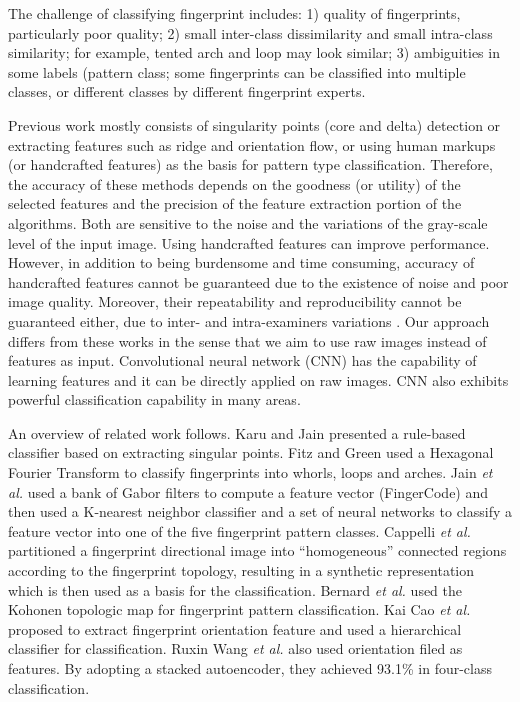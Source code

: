 
The challenge of classifying fingerprint includes: 
%
1) quality of fingerprints, particularly poor quality; 
%
2) small inter-class dissimilarity and small intra-class similarity; for example, tented arch and loop may look similar; 
%
3) ambiguities in some labels (pattern class; some fingerprints can be classified into multiple classes, or different classes by different fingerprint experts.

Previous work mostly consists of singularity points (core and delta) detection or extracting features such as ridge and orientation flow, or using human markups (or handcrafted features) as the basis for pattern type classification. 
%
Therefore, the accuracy of these methods depends on the goodness (or utility) of the selected features and the precision of the feature extraction portion of the algorithms. Both are sensitive to the noise and the variations of the gray-scale level of the input image.  
%
Using handcrafted features can improve performance.  However, in addition to being burdensome and time consuming, accuracy of handcrafted features cannot be guaranteed due to the existence of noise and poor image quality. 
%
Moreover, their repeatability and reproducibility cannot be guaranteed either, due to inter- and intra-examiners variations \cite{fbiBlackbox}.  
%
Our approach differs from these works in the sense that we aim to use raw images instead of features as input. Convolutional neural network (CNN) has the capability of learning features and it can be directly applied on raw images. CNN also exhibits powerful classification capability in many areas\cite{lecun2015deep}\cite{szegedy2016rethinking}.

%
An overview of related work follows. 
%
Karu and Jain \cite{karuJain1996} presented a rule-based classifier based on extracting singular points. 
%
Fitz and Green \cite{FitzGreen1996} used a Hexagonal Fourier Transform to classify fingerprints into whorls, loops and arches. 
%
Jain \textit{et al.} \cite{JainSalil1999} used a bank of Gabor filters to compute a feature vector (FingerCode) and then used a K-nearest neighbor classifier and a set of neural networks to classify a feature vector into one of the five fingerprint pattern classes.
%
Cappelli \textit{et al.} \cite{cappelli1999} partitioned a fingerprint directional image into ``homogeneous'' connected regions according to the fingerprint topology, resulting in a synthetic representation which is then used as a basis for the classification.
%
Bernard \textit{et al.} \cite{Bernard2001} used the Kohonen topologic map for fingerprint pattern classification. 
%
Kai Cao \textit{et al.}\cite{cao2013fingerprint} proposed to extract fingerprint orientation feature and used a hierarchical classifier for classification.
%
Ruxin Wang \textit{et al.} \cite{wang2014fingerprint} also used orientation filed as features. By adopting a stacked autoencoder, they achieved 93.1\% in four-class classification.
 
